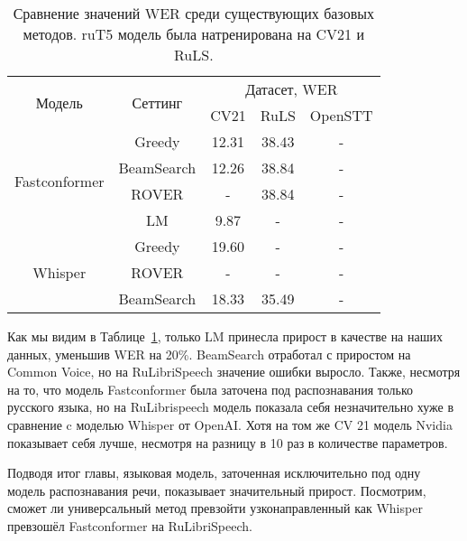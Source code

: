\begin{table}[]
\centering
\caption{Сравнение значений WER среди существующих базовых методов. ruT5 модель была натренирована на CV21 и RuLS.}
\begin{tabular}{|c|c|ccc|}
\hline
\multirow{2}{*}{Модель}        & \multirow{2}{*}{Сеттинг}             & \multicolumn{3}{c|}{Датасет, WER}                                    \\ \cline{3-5} 
                               &                                      & \multicolumn{1}{c|}{CV21}  & \multicolumn{1}{c|}{RuLS}     & OpenSTT \\ \hline
\multirow{4}{*}{Fastconformer} & Greedy                               & \multicolumn{1}{c|}{12.31} & \multicolumn{1}{c|}{38.43}    & -       \\ \cline{2-5} 
                               & BeamSearch                           & \multicolumn{1}{c|}{12.26} & \multicolumn{1}{c|}{38.84}    & -       \\ \cline{2-5}
                               & ROVER                                & \multicolumn{1}{c|}{-} & \multicolumn{1}{c|}{38.84}    & -       \\ \cline{2-5}
                               & LM                                   & \multicolumn{1}{c|}{9.87}  & \multicolumn{1}{c|}{-}    & -       \\ \hline 
\multirow{3}{*}{Whisper}       & Greedy                               & \multicolumn{1}{c|}{19.60} & \multicolumn{1}{c|}{-}    & -       \\ \cline{2-5} 
                               & ROVER                                & \multicolumn{1}{c|}{-} & \multicolumn{1}{c|}{-}    & -       \\ \cline{2-5}
                               & BeamSearch                           & \multicolumn{1}{c|}{18.33} & \multicolumn{1}{c|}{35.49}    & -       \\ \hline
                               
\end{tabular}
\label{tab:res_comp}
\end{table}

Как мы видим в Таблице~\ref{tab:res_comp}, только LM принесла прирост в качестве на наших данных, уменьшив WER на 20\%.
BeamSearch отработал с приростом на Common Voice, но на RuLibriSpeech значение ошибки выросло.
Также, несмотря на то, что модель Fastconformer была заточена под распознавания только русского языка, но на RuLibrispeech модель показала себя незначительно хуже в сравнение c моделью Whisper от OpenAI.
Хотя на том же CV 21 модель Nvidia показывает себя лучше, несмотря на разницу в 10 раз в количестве параметров.

Подводя итог главы, языковая модель, заточенная исключительно под одну модель распознавания речи, показывает значительный прирост.
Посмотрим, сможет ли универсальный метод превзойти узконаправленный как Whisper превзошёл Fastconformer на RuLibriSpeech.